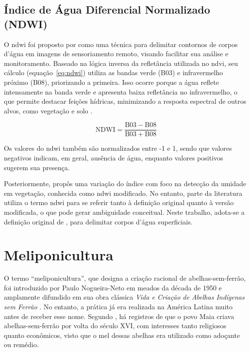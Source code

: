 \subsection{Índice de Água Diferencial Normalizado (NDWI)}
O \gls{ndwi} foi proposto por  como uma técnica para delimitar contornos de corpos d'água em imagens de sensoriamento remoto, visando facilitar sua análise e monitoramento. Baseado na lógica inversa da refletância utilizada no \gls{ndvi}, seu cálculo (equação~\ref{eq:ndwi}) utiliza as bandas verde (B03) e infravermelho próximo (B08), priorizando a primeira. Isso ocorre porque a água reflete intensamente na banda verde e apresenta baixa refletância no infravermelho, o que permite destacar feições hídricas, minimizando a resposta espectral de outros alvos, como vegetação e solo \cite{Santos:2017, simoes:2021}.

\begin{equation}
\mathrm{NDWI} = \frac{\mathrm{B03} - \mathrm{B08}}{\mathrm{B03} + \mathrm{B08}}
\label{eq:ndwi}
\end{equation}

Os valores do \gls{ndwi} também são normalizados entre -1 e 1, sendo que valores negativos indicam, em geral, ausência de água, enquanto valores positivos sugerem sua presença.

Posteriormente,  propôs uma variação do índice com foco na detecção da umidade em vegetação, conhecida como \gls{ndwi} modificado. No entanto, parte da literatura utiliza o termo \gls{ndwi} para se referir tanto à definição original quanto à versão modificada, o que pode gerar ambiguidade conceitual. Neste trabalho, adota-se a definição original de , para delimitar corpos d’água superficiais.

\section{Meliponicultura}
O termo “meliponicultura”, que designa a criação racional de abelhas-sem-ferrão, foi introduzido por Paulo Nogueira-Neto em meados da década de 1950 e amplamente difundido em sua obra clássica \textit{Vida e Criação de Abelhas Indígenas sem Ferrão} . No entanto, a prática já era realizada na América Latina muito antes de receber esse nome. Segundo , há registros de que o povo Maia criava abelhas-sem-ferrão por volta do século XVI, com interesses tanto religiosos quanto econômicos, visto que o mel dessas abelhas era utilizado como adoçante ou remédio.

